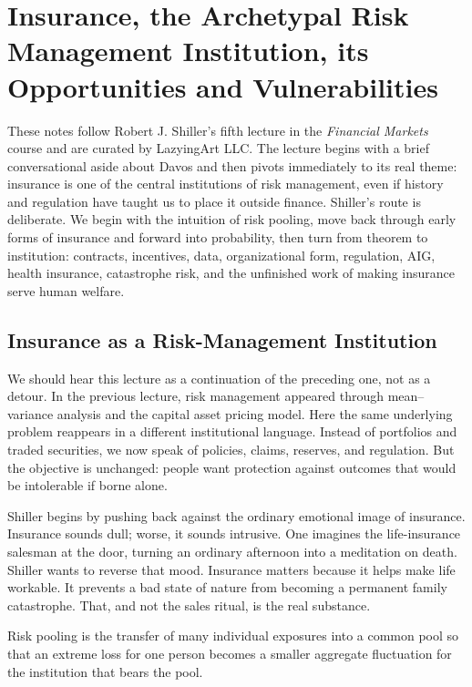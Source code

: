 \chapter{Insurance, the Archetypal Risk Management Institution, its Opportunities and Vulnerabilities}

These notes follow Robert J. Shiller's fifth lecture in the \emph{Financial Markets} course and are curated by LazyingArt LLC. The lecture begins with a brief conversational aside about Davos and then pivots immediately to its real theme: insurance is one of the central institutions of risk management, even if history and regulation have taught us to place it outside finance. Shiller's route is deliberate. We begin with the intuition of risk pooling, move back through early forms of insurance and forward into probability, then turn from theorem to institution: contracts, incentives, data, organizational form, regulation, AIG, health insurance, catastrophe risk, and the unfinished work of making insurance serve human welfare.

\section{Insurance as a Risk-Management Institution}

We should hear this lecture as a continuation of the preceding one, not as a detour. In the previous lecture, risk management appeared through mean--variance analysis and the capital asset pricing model. Here the same underlying problem reappears in a different institutional language. Instead of portfolios and traded securities, we now speak of policies, claims, reserves, and regulation. But the objective is unchanged: people want protection against outcomes that would be intolerable if borne alone.

Shiller begins by pushing back against the ordinary emotional image of insurance. Insurance sounds dull; worse, it sounds intrusive. One imagines the life-insurance salesman at the door, turning an ordinary afternoon into a meditation on death. Shiller wants to reverse that mood. Insurance matters because it helps make life workable. It prevents a bad state of nature from becoming a permanent family catastrophe. That, and not the sales ritual, is the real substance.

\begin{definition}
Risk pooling is the transfer of many individual exposures into a common pool so that an extreme loss for one person becomes a smaller aggregate fluctuation for the institution that bears the pool.
\end{definition}

